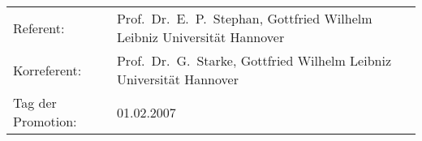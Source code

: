 
\thispagestyle{empty}
\phantom{a}

\vfill
\begin{tabular}{ll}
Referent:& Prof.\ Dr.\ E.\ P.\ Stephan, Gottfried Wilhelm Leibniz Universit\"at Hannover\\
Korreferent:& Prof.\ Dr.\  G.\ Starke, Gottfried Wilhelm Leibniz Universit\"at Hannover\\
Tag der Promotion:& 01.02.2007
\end{tabular}
\newpage
